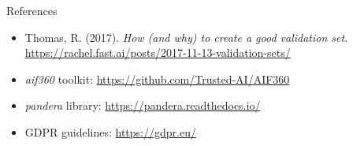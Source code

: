 \documentclass[aspectratio=169]{beamer}
\begin{document}
%

\begin{frame}{References}
\footnotesize
\begin{itemize}
\item Thomas, R. (2017). \textit{How (and why) to create a good validation set}. \url{https://rachel.fast.ai/posts/2017-11-13-validation-sets/}
\item \textit{aif360} toolkit: \url{https://github.com/Trusted-AI/AIF360}
\item \textit{pandera} library: \url{https://pandera.readthedocs.io/}
\item GDPR guidelines: \url{https://gdpr.eu/}
\end{itemize}
\end{frame}
\end{document}
